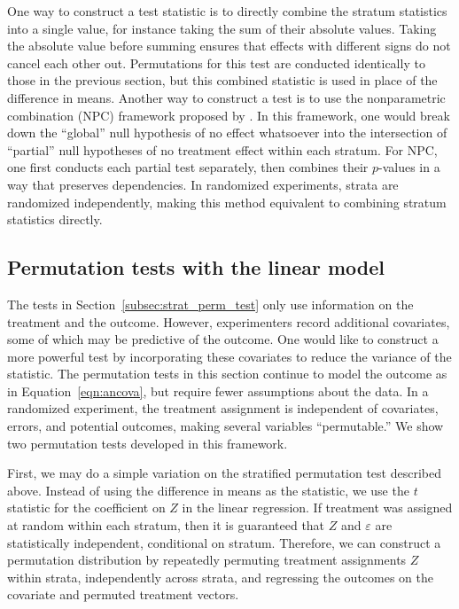 \documentclass[12pt]{article}
\begin{document}
One way to construct a test statistic is to directly combine the stratum statistics into a single value, for instance taking the sum of their absolute values.
Taking the absolute value before summing ensures that effects with different signs do not cancel each other out.
Permutations for this test are conducted identically to those in the previous section, but this combined statistic is used in place of the difference in means.
Another way to construct a test is to use the nonparametric combination (NPC) framework proposed by \citet{pesarin_permutation_2010}.
In this framework, one would break down the ``global'' null hypothesis of no effect whatsoever into the intersection of ``partial'' null hypotheses of no treatment effect within each stratum.
For NPC, one first conducts each partial test separately, then combines their $p$-values in a way that preserves dependencies.
In randomized experiments, strata are randomized independently, making this method equivalent to combining stratum statistics directly.


\subsection{Permutation tests with the linear model}\label{subsec:lm_perm_tests}
The tests in Section~\ref{subsec:strat_perm_test} only use information on the treatment and the outcome.
However, experimenters record additional covariates, some of which may be predictive of the outcome.
One would like to construct a more powerful test by incorporating these covariates to reduce the variance of the statistic.
The permutation tests in this section continue to model the outcome as in Equation~\ref{eqn:ancova}, but require fewer assumptions about the data.
In a randomized experiment, the treatment assignment is independent of covariates, errors, and potential outcomes,
making several variables ``permutable.''
We show two permutation tests developed in this framework.

First, we may do a simple variation on the stratified permutation test described above.
Instead of using the difference in means as the statistic, we use the $t$ statistic for the coefficient on $Z$ in the linear regression.
If treatment was assigned at random within each stratum, then it is guaranteed that $Z$ and $\varepsilon$ are statistically independent, conditional on stratum.
Therefore, we can construct a permutation distribution by repeatedly permuting treatment assignments $Z$ within strata, independently across strata, and regressing the outcomes on the covariate and permuted treatment vectors.
\end{document}
